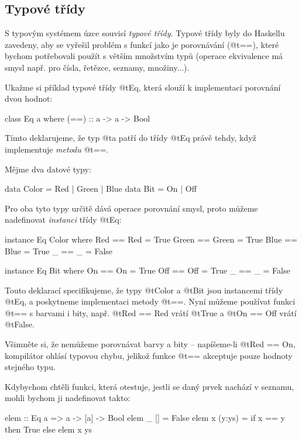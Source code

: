 \subsection{Typové třídy}

S typovým systémem úzce souvisí \emph{typové třídy}. Typové třídy byly do
Haskellu zavedeny, aby se vyřešil problém s  funkcí jako je
porovnávání (@t{==}), které bychom potřebovali použít s větším množstvím typů
(operace ekvivalence má smysl např. pro čísla, řetězce, seznamy, množiny...).

Ukažme si příklad typové třídy @t{Eq}, která slouží k implementaci porovnání
dvou hodnot:

\begin{haskell}
class Eq a where
  (==) :: a -> a -> Bool
\end{haskell}

Tímto deklarujeme, že typ @t{a} patří do třídy @t{Eq} právě tehdy, když
implementuje \emph{metodu} @t{==}.

Mějme dva datové typy:

\begin{haskell}
data Color = Red | Green | Blue
data Bit = On | Off
\end{haskell}

Pro oba tyto typy určitě dává operace porovnání smysl, proto můžeme nadefinovat
\emph{instanci} třídy @t{Eq}:

\begin{haskell}
instance Eq Color where
  Red   == Red   = True
  Green == Green = True
  Blue  == Blue  = True
  _     == _     = False

instance Eq Bit where
  On  == On  = True
  Off == Off = True
  _   == _   = False
\end{haskell}

Touto deklarací specifikujeme, že typy @t{Color} a @t{Bit} jsou instancemi třídy @t{Eq}, a
poskytneme implementaci metody @t{==}. Nyní můžeme používat funkci @t{==} s
barvami i bity, např. @t{Red == Red} vrátí @t{True} a @t{On == Off} vrátí
@t{False}.

Všimněte si, že nemůžeme porovnávat barvy a bity -- napíšeme-li @t{Red == On},
kompilátor ohlásí typovou chybu, jelikož funkce @t{==} akceptuje pouze hodnoty
stejného typu.

Kdybychom chtěli funkci, která otestuje, jestli se daný prvek nachází v
seznamu, mohli bychom ji nadefinovat takto:

\begin{haskell}
elem :: Eq a => a -> [a] -> Bool
elem _ [] = False
elem x (y:ys) = if x == y then True else elem x ys
\end{haskell}

